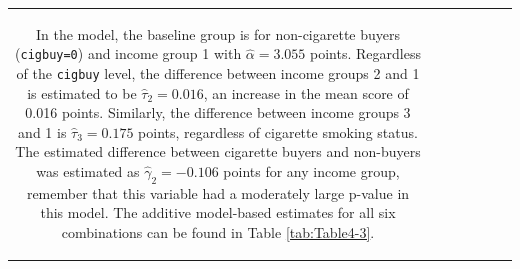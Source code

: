 \documentclass[]{book}
\newenvironment{Shaded}{\begin{snugshade}}{\end{snugshade}}
\theoremstyle{definition}
\theoremstyle{definition}
\theoremstyle{remark}
\begin{document}
\begin{longtable}[]{@{}ccccccc@{}}
\begin{minipage}[b]{0.10\columnwidth}
\begin{Shaded}
\begin{Highlighting}[]
\begin{Shaded}
\begin{Highlighting}[]
\begin{Shaded}
\begin{Highlighting}[]
\begin{Shaded}
\begin{Highlighting}[]
\begin{Shaded}
\begin{Highlighting}[]
In the model, the baseline group is for non-cigarette buyers
(\texttt{cigbuy=0}) and income group 1 with \(\hat{\alpha}= 3.055\)
points. Regardless of the \texttt{cigbuy} level, the difference between
income groups 2 and 1 is estimated to be \(\hat{\tau}_2=0.016\), an
increase in the mean score of 0.016 points. Similarly, the difference
between income groups 3 and 1 is \(\hat{\tau}_3=0.175\) points,
regardless of cigarette smoking status. The estimated difference between
cigarette buyers and non-buyers was estimated as
\(\hat{\gamma}_2=-0.106\) points for any income group, remember that
this variable had a moderately large p-value in this model. The additive
model-based estimates for all six combinations can be found in Table
\ref{tab:Table4-3}.




\small


\end{Highlighting}
\end{Shaded}
\end{Highlighting}
\end{Shaded}
\end{Highlighting}
\end{Shaded}
\end{Highlighting}
\end{Shaded}
\end{Highlighting}
\end{Shaded}
\end{minipage}
\end{longtable}
\end{document}
